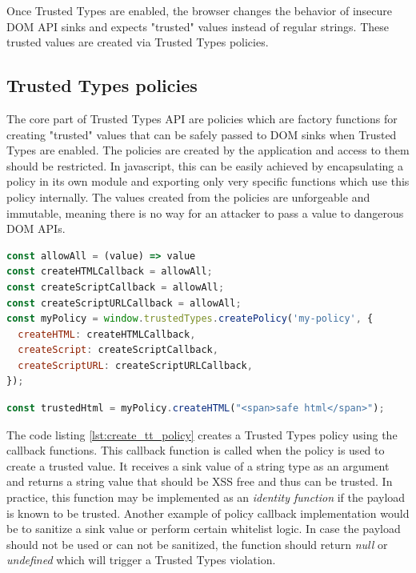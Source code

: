 Once Trusted Types are enabled, the browser changes the behavior of insecure DOM API sinks and
expects "trusted" values instead of regular strings. These trusted values are created via Trusted
Types policies.

\subsection{Trusted Types policies}
\label{subsec:tt_policy}

The core part of Trusted Types API are policies which are factory functions for creating "trusted"
values that can be safely passed to DOM sinks when Trusted Types are enabled. The policies are
created by the application and access to them should be restricted. In javascript, this can be
easily achieved by encapsulating a policy in its own module and exporting only very specific
functions which use this policy internally. The values created from the policies are unforgeable and
immutable, meaning there is no way for an attacker to pass a value to dangerous DOM APIs.

\vspace{5mm}
\bigskip
\begin{lstlisting}[language=JavaScript, caption=Creating a Trusted Types policy, label={lst:create_tt_policy}]
const allowAll = (value) => value
const createHTMLCallback = allowAll;
const createScriptCallback = allowAll;
const createScriptURLCallback = allowAll;
const myPolicy = window.trustedTypes.createPolicy('my-policy', {
  createHTML: createHTMLCallback,
  createScript: createScriptCallback,
  createScriptURL: createScriptURLCallback,
});
\end{lstlisting}

\bigskip
\begin{lstlisting}[language=JavaScript, caption=Create trusted value using a policy]
const trustedHtml = myPolicy.createHTML("<span>safe html</span>");
\end{lstlisting}

\vspace{5mm}

The code listing \ref{lst:create_tt_policy} creates a Trusted Types policy using the callback
functions. This callback function is called when the policy is used to create a trusted value. It
receives a sink value of a string type as an argument and returns a string value that should be XSS
free and thus can be trusted. In practice, this function may be implemented as an \emph{identity
  function} if the payload is known to be trusted. Another example of policy callback implementation
would be to sanitize a sink value or perform certain whitelist logic. In case the payload should not
be used or can not be sanitized, the function should return \emph{null} or \emph{undefined} which
will trigger a Trusted Types violation.

